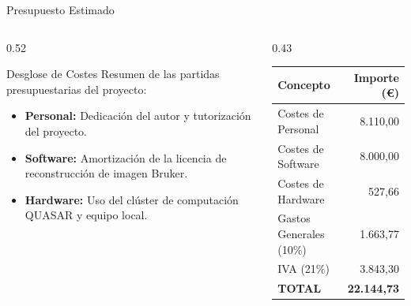 \documentclass[aspectratio=169]{beamer}
\begin{document}
\begin{frame}{Presupuesto Estimado}
    \begin{columns}[c]
        \begin{column}{0.52\textwidth}
            \begin{block}{Desglose de Costes}
                Resumen de las partidas presupuestarias del proyecto:
                \begin{itemize}\setlength{\itemsep}{0.5em}
                    \item \textbf{Personal:} Dedicación del autor y tutorización del proyecto.
                    \item \textbf{Software:} Amortización de la licencia de reconstrucción de imagen Bruker.
                    \item \textbf{Hardware:} Uso del clúster de computación QUASAR y equipo local.
                \end{itemize}
            \end{block}
        \end{column}
        \begin{column}{0.43\textwidth}
            \centering
            \small
            \begin{table}
                \centering
                \begin{tabular}{lr}
                    \toprule
                    \textbf{Concepto} & \textbf{Importe (€)} \\
                    \midrule
                    Costes de Personal & 8.110,00 \\
                    Costes de Software & 8.000,00 \\
                    Costes de Hardware & 527,66 \\
                    Gastos Generales (10\%) & 1.663,77 \\
                    IVA (21\%) & 3.843,30 \\
                    \midrule
                    \textbf{TOTAL} & \textbf{22.144,73} \\
                    \bottomrule
                \end{tabular}
            \end{table}
        \end{column}
    \end{columns}
\end{frame}
\end{document}

